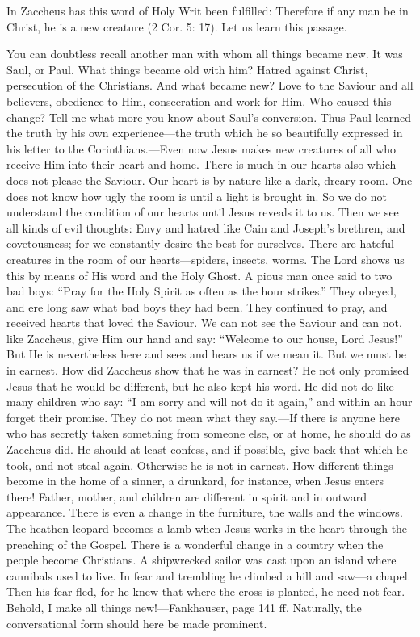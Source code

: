 In Zaccheus has this word of Holy Writ been fulfilled: Therefore if any man be in Christ, he is a new creature (2 Cor. 5: 17). Let us learn this passage.

You can doubtless recall another man with whom all things became new. It was Saul, or Paul. What things became old with him? Hatred against Christ, persecution of the Christians. And what became
new? Love to the Saviour and all believers, obedience to Him, consecration and work for Him. Who caused this change? Tell me what more you know about Saul’s conversion. Thus Paul learned the truth by his own experience—the truth which he so beautifully expressed in his letter to the Corinthians.—Even now Jesus makes new creatures of all who receive Him into their heart and home. There is much in our hearts also which does not please the Saviour. Our heart is by nature like a dark, dreary room. One does not know how ugly the room is until a light is brought in. So we do not understand the condition of our hearts until Jesus reveals it to us. Then we see all kinds of evil thoughts: Envy and hatred like Cain and Joseph’s brethren, and covetousness; for we constantly desire the best for ourselves. There are hateful creatures in the room of our hearts—spiders, insects, worms. The Lord shows us this by means of His word and the Holy Ghost. A pious man once said to two bad boys: “Pray for the Holy Spirit as often as the hour strikes.” They obeyed, and ere long saw what bad boys they had been. They continued to pray, and received hearts that loved the Saviour. We can not see the Saviour and can not, like Zaccheus, give Him our hand and say: “Welcome to our house, Lord Jesus!” But He is nevertheless here and sees and hears us if we mean it. But we must be in earnest. How did Zaccheus show that he was in earnest? He not only promised Jesus that he would be different, but he also kept his word. He did not do like many children who say: “I am sorry and will not do it again,” and within an hour forget their promise. They do not mean what they say.—If there is anyone here who has secretly taken something from someone else, or at home, he should do as Zaccheus did. He should at least confess, and if possible, give back that which he took, and not steal again. Otherwise he is not in earnest. How different things become in the home of a sinner, a drunkard, for instance, when Jesus enters there! Father, mother, and children are different in spirit and in outward appearance. There is even a change in the furniture, the walls and the windows. The heathen leopard becomes a lamb when Jesus works in the heart through the preaching of the Gospel. There is a wonderful change in a country when the people become Christians. A shipwrecked sailor was cast upon an island where cannibals used to live. In fear and trembling he climbed a hill and saw—a chapel. Then his fear fled, for he knew that where the cross is planted, he need not fear. Behold, I make all things new!—Fankhauser, page 141 ff. Naturally, the conversational form should here be made prominent.

